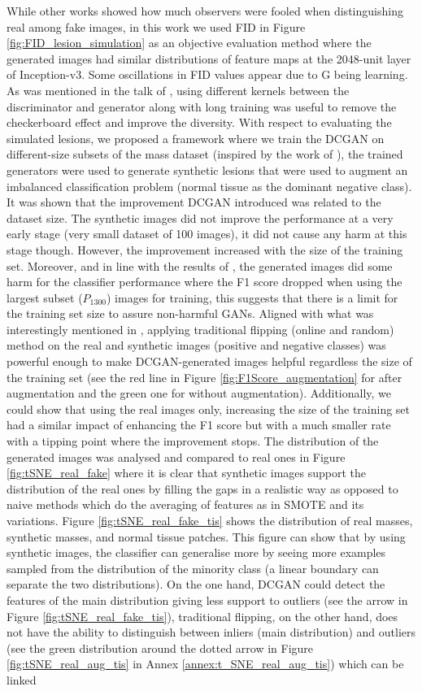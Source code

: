 \documentclass[final,3p,twocolumn,authoryear,sort&compress,times]{maia}
\begin{document}
While other works showed how much observers were fooled when distinguishing real among fake images, in this work we used FID in Figure \ref{fig:FID_lesion_simulation} as an objective evaluation method where the generated images had similar distributions of feature maps at the 2048-unit layer of Inception-v3. Some oscillations in FID values appear due to G being learning. As was mentioned in the talk of \citet{nips2016}, using different kernels between the discriminator and generator along with long training was useful to remove the checkerboard effect and improve the diversity. With respect to evaluating the simulated lesions, we proposed a framework where we train the DCGAN on different-size subsets of the mass dataset (inspired by the work of \citet{liver_aug}), the trained generators were used to generate synthetic lesions that were used to augment an imbalanced classification problem (normal tissue as the dominant negative class). It was shown that the improvement DCGAN introduced was related to the dataset size. The synthetic images did not improve the performance at a very early stage (very small dataset of 100 images), it did not cause any harm at this stage though. However, the improvement increased with the size of the training set. Moreover, and in line with the results of \citet{GAN_brain_aug}, the generated images did some harm for the classifier performance where the F1 score dropped when using the largest subset ($P_{1300}$) images for training, this suggests that there is a limit for the training set size to assure non-harmful GANs. Aligned with what was interestingly mentioned in \citet{GAN_brain_aug}, applying traditional flipping (online and random) method on the real and synthetic images (positive and negative classes) was powerful enough to make DCGAN-generated images helpful regardless the size of the training set (see the red line in Figure \ref{fig:F1Score_augmentation} for after augmentation and the green one for without augmentation). Additionally, we could show that using the real images only, increasing the size of the training set had a similar impact of enhancing the F1 score but with a much smaller rate with a tipping point where the improvement stops. The distribution of the generated images was analysed and compared to real ones in Figure \ref{fig:tSNE_real_fake} where it is clear that synthetic images support the distribution of the real ones by filling the gaps in a realistic way as opposed to naive methods which do the averaging of features as in SMOTE and its variations. Figure \ref{fig:tSNE_real_fake_tis} shows the distribution of real masses, synthetic masses, and normal tissue patches. This figure can show that by using synthetic images, the classifier can generalise more by seeing more examples sampled from the distribution of the minority class (a linear boundary can separate the two distributions). On the one hand, DCGAN could detect the features of the main distribution giving less support to outliers (see the arrow in Figure \ref{fig:tSNE_real_fake_tis}), traditional flipping, on the other hand, does not have the ability to distinguish between inliers (main distribution) and outliers (see the green distribution around the dotted arrow in Figure \ref{fig:tSNE_real_aug_tis} in Annex \ref{annex:t_SNE_real_aug_tis}) which can be linked 
\end{document}
